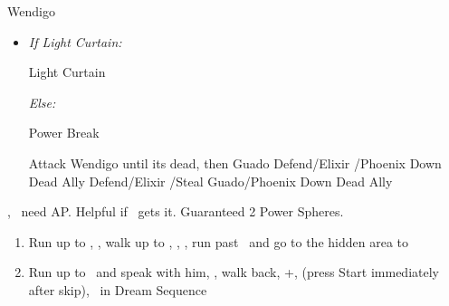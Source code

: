 \winvfill
\bothvfill
\begin{battle}[18000]{Wendigo}
	\begin{itemize}
		\tidusf Haste \tidus
		\tidusf Switch Weapon to Brotherhood
		\tidusf Attack Guado B (Top One)
		\item \textit{If Light Curtain:}
		      \begin{itemize}
			      \rikkuf Light Curtain \tidus
		      \end{itemize}
		      \textit{Else:}
		      \begin{itemize}
			      \switch{\rikku}{\auron}
			      \auronf Power Break
		      \end{itemize}
		      \tidusf Attack Wendigo until its dead, then Guado
		      \yunaf Defend/Elixir \tidus/Phoenix Down Dead Ally
		      \rikkuf Defend/Elixir \tidus/Steal Guado/Phoenix Down Dead Ally
		      \switch{\yuna}{\lulu}
	\end{itemize}
	\yuna, \tidus\ need AP. Helpful if \lulu\ gets it.
	Guaranteed 2 Power Spheres.
\end{battle}
\begin{enumerate}[resume]
	\item Run up to \rikku, \sd, walk up to \yuna, \sd, \save, run past \kimahri\ and go to the hidden area to 
	\winvfill
	\item Run up to \auron\ and speak with him, \sd, walk back, \cs+\skippablefmv[1:00], (press Start immediately after skip), \sd\ in Dream Sequence
\end{enumerate}